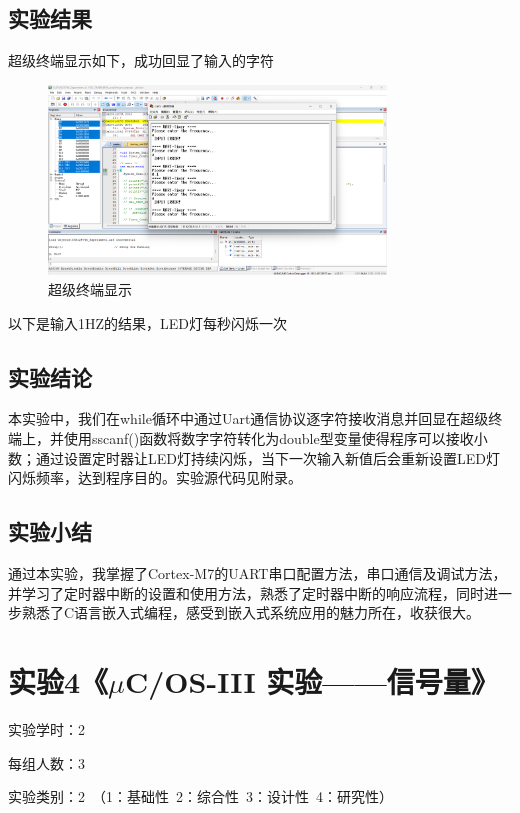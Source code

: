 ﻿\documentclass[UTF8,12pt]{article}
\begin{document}
\subsection{实验结果}

超级终端显示如下，成功回显了输入的字符

\begin{figure}[htbp]
  \centering
  \includegraphics[width=0.8\textwidth]{imgs/15.png}
  \caption{超级终端显示}
\end{figure}

以下是输入1HZ的结果，LED灯每秒闪烁一次

\newpage

\subsection{实验结论}
本实验中，我们在while循环中通过Uart通信协议逐字符接收消息并回显在超级终端上，并使用sscanf()函数将数字字符转化为double型变量使得程序可以接收小数；通过设置定时器让LED灯持续闪烁，当下一次输入新值后会重新设置LED灯闪烁频率，达到程序目的。实验源代码见附录。

\subsection{实验小结}
通过本实验，我掌握了Cortex-M7的UART串口配置方法，串口通信及调试方法，并学习了定时器中断的设置和使用方法，熟悉了定时器中断的响应流程，同时进一步熟悉了C语言嵌入式编程，感受到嵌入式系统应用的魅力所在，收获很大。

\newpage

\section{实验4《$\mu$C/OS-III 实验——信号量》}

实验学时：2

每组人数：3

实验类别：2\ （1：基础性\ 2：综合性\ 3：设计性\ 4：研究性）
\end{document}
